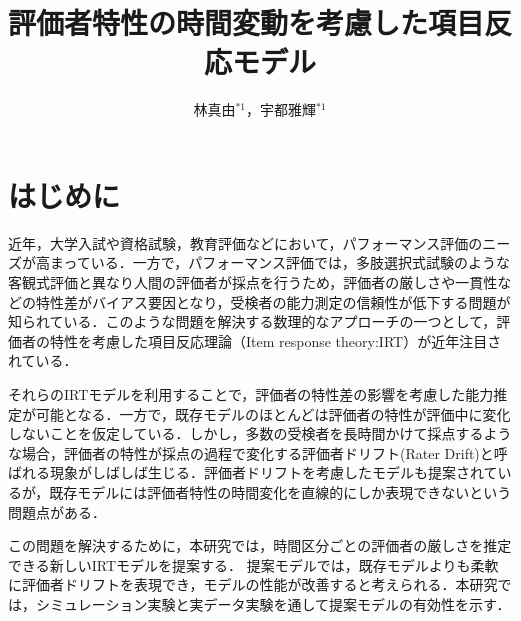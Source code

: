 \documentclass[twocolumn,10pt]{jsarticle}
\title{評価者特性の時間変動を考慮した項目反応モデル}
\author{林真由$^{*1}$，宇都雅輝$^{*1}$}
\begin{document}
\thispagestyle{empty} 

\section{はじめに}\label{sec:intro}
\vspace{-2mm}

近年，大学入試や資格試験，教育評価などにおいて，パフォーマンス評価のニーズが高まっている．一方で，パフォーマンス評価では，多肢選択式試験のような客観式評価と異なり人間の評価者が採点を行うため，評価者の厳しさや一貫性などの特性差がバイアス要因となり，受検者の能力測定の信頼性が低下する問題が知られている．このような問題を解決する数理的なアプローチの一つとして，評価者の特性を考慮した項目反応理論（Item response theory:IRT）\cite{IRTLord}が近年注目されている．

それらのIRTモデルを利用することで，評価者の特性差の影響を考慮した能力推定が可能となる．一方で，既存モデルのほとんどは評価者の特性が評価中に変化しないことを仮定している．しかし，多数の受検者を長時間かけて採点するような場合，評価者の特性が採点の過程で変化する評価者ドリフト(Rater Drift)と呼ばれる現象がしばしば生じる．評価者ドリフトを考慮したモデルも提案されているが，既存モデルには評価者特性の時間変化を直線的にしか表現できないという問題点がある．

この問題を解決するために，本研究では，時間区分ごとの評価者の厳しさを推定できる新しいIRTモデルを提案する．
提案モデルでは，既存モデルよりも柔軟に評価者ドリフトを表現でき，モデルの性能が改善すると考えられる．本研究では，シミュレーション実験と実データ実験を通して提案モデルの有効性を示す．
\end{document}

